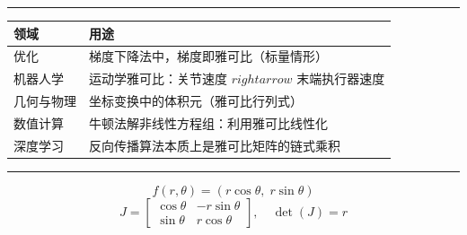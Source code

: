 \begin{center}\rule{0.5\linewidth}{0.5pt}\end{center}

\label{ux5178ux578bux5e94ux7528}


\begin{tabular}{ll}
\toprule
\textbf{领域} & \textbf{用途} \\
\midrule
优化 & 梯度下降法中，梯度即雅可比（标量情形） \\
机器人学 & 运动学雅可比：关节速度 $rightarrow$ 末端执行器速度 \\
几何与物理 & 坐标变换中的体积元（雅可比行列式） \\
数值计算 & 牛顿法解非线性方程组：利用雅可比线性化 \\
深度学习 & 反向传播算法本质上是雅可比矩阵的链式乘积 \\
\bottomrule
\end{tabular}

\begin{center}\rule{0.5\linewidth}{0.5pt}\end{center}

\label{ux4f8bux5b50}

\label{ux4f8b1ux6781ux5750ux6807ux53d8ux6362mathbbr2-to-mathbbr2}

\[
f(r,\theta) = (r\cos\theta,\; r\sin\theta)
\] \[
J = \begin{bmatrix}
\cos\theta & -r\sin\theta \\
\sin\theta &  r\cos\theta
\end{bmatrix},\quad \det(J) = r
\]


